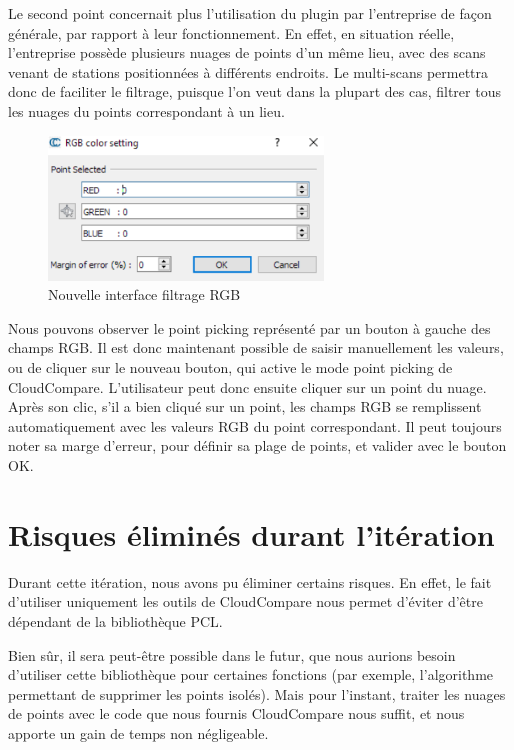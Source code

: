 \documentclass[12pt,titlepage,french]{article}
\begin{document}
Le second point concernait plus l'utilisation du plugin par l'entreprise de façon générale, par rapport à leur fonctionnement. En effet, en situation réelle, l'entreprise possède plusieurs nuages de points d'un même lieu, avec des scans venant de stations positionnées à différents endroits. Le multi-scans permettra donc de faciliter le filtrage, puisque l'on veut dans la plupart des cas, filtrer tous les nuages du points correspondant à un lieu.

\begin{figure}[!hbtp]
  \caption{\label{} Nouvelle interface filtrage RGB}
  \includegraphics[width=0.65\textwidth]{./img/new_ui.png}
\end{figure}

Nous pouvons observer le point picking représenté par un bouton à gauche des champs RGB. Il est donc maintenant possible de saisir manuellement les valeurs, ou de cliquer sur le nouveau bouton, qui active le mode point picking de CloudCompare. L'utilisateur peut donc ensuite cliquer sur un point du nuage. Après son clic, s'il a bien cliqué sur un point, les champs RGB se remplissent automatiquement avec les valeurs RGB du point correspondant. Il peut toujours noter sa marge d'erreur, pour définir sa plage de points, et valider avec le bouton OK.

\section{Risques éliminés durant l'itération}
Durant cette itération, nous avons pu éliminer certains risques. En effet, le fait d'utiliser uniquement les outils de CloudCompare nous permet d'éviter d'être dépendant de la bibliothèque PCL. \newline

Bien sûr, il sera peut-être possible dans le futur, que nous aurions besoin d'utiliser cette bibliothèque pour certaines fonctions (par exemple, l'algorithme permettant de supprimer les points isolés). Mais pour l'instant, traiter les nuages de points avec le code que nous fournis CloudCompare nous suffit, et nous apporte un gain de temps non négligeable. \newline
\end{document}
